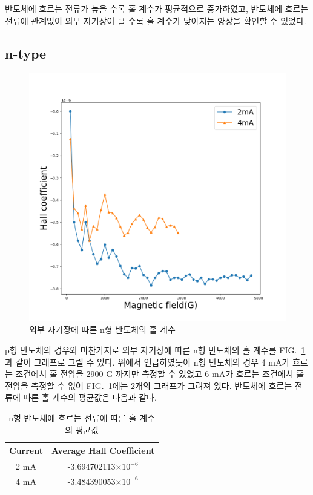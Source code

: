\documentclass[aps,reprint,superscriptaddress,10pt]{revtex4-2}
\begin{document}
  반도체에 흐르는 전류가 높을 수록 홀 계수가 평균적으로 증가하였고, 반도체에 흐르는 전류에
  관계없이 외부 자기장이 클 수록 홀 계수가 낮아지는 양상을 확인할 수 있었다.
\subsection{n-type}

\begin{figure}[htbp]
  \centering
  \includegraphics[scale = 0.3]{co_n.png}
  \caption{외부 자기장에 따른 n형 반도체의 홀 계수}\label{fig:co_n}
\end{figure}

p형 반도체의 경우와 마찬가지로 외부 자기장에 따른 
n형 반도체의 홀 계수를 FIG.~\ref{fig:co_n}과 같이 그래프로 그릴 수 있다. 위에서 언급하였듯이 
n형 반도체의 경우 4 mA가 흐르는 조건에서 홀 전압을 2900 G 까지만 측정할 수 있었고
6 mA가 흐르는 조건에서 홀 전압을 측정할 수 없어 FIG.~\ref{fig:co_n}에는 2개의 그래프가 그려져
있다. 반도체에 흐르는 전류에 따른 홀 계수의 평균값은 다음과 같다.
\vspace{0.2cm}
  \begin{table}
    \begin{tabular}{ c|c } 
      \hline
      \hline
      Current & Average Hall Coefficient \\
      \hline
      2 mA & -3.694702113$\times 10^{-6}$ \\ 
      4 mA & -3.484390053$\times 10^{-6}$ \\ 
      \hline
      \hline
    \end{tabular}
    \caption{n형 반도체에 흐르는 전류에 따른 홀 계수의 평균값}
    \end{table}
\end{document}
